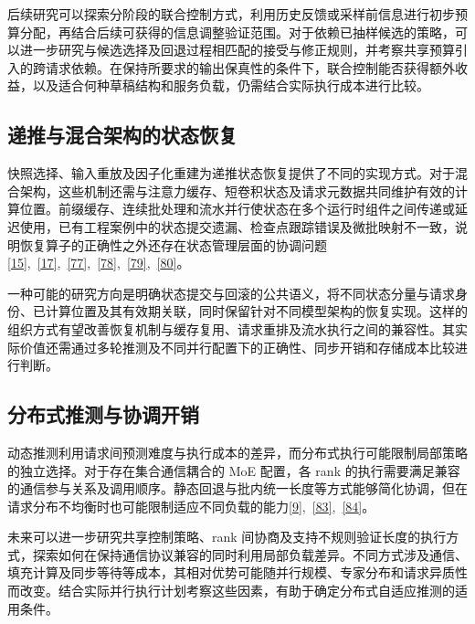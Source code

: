 \documentclass[11pt,a4paper,UTF8,fontset=none,scheme=plain,zihao=-4]{ctexart}
\begin{document}
后续研究可以探索分阶段的联合控制方式，利用历史反馈或采样前信息进行初步预算分配，再结合后续可获得的信息调整验证范围。对于依赖已抽样候选的策略，可以进一步研究与候选选择及回退过程相匹配的接受与修正规则，并考察共享预算引入的跨请求依赖。在保持所要求的输出保真性的条件下，联合控制能否获得额外收益，以及适合何种草稿结构和服务负载，仍需结合实际执行成本进行比较。

\hypertarget{section-8-3}{%
\subsection{递推与混合架构的状态恢复}\label{section-8-3}}

快照选择、输入重放及因子化重建为递推状态恢复提供了不同的实现方式。对于混合架构，这些机制还需与注意力缓存、短卷积状态及请求元数据共同维护有效的计算位置。前缀缓存、连续批处理和流水并行使状态在多个运行时组件之间传递或延迟使用，已有工程案例中的状态提交遗漏、检查点跟踪错误及微批映射不一致，说明恢复算子的正确性之外还存在状态管理层面的协调问题\protect\hyperlink{ref-replayssm}{{[}15{]}},~\protect\hyperlink{ref-twig}{{[}17{]}},~\protect\hyperlink{ref-sglngramcommit}{{[}77{]}},~\protect\hyperlink{ref-sglsconvcommit}{{[}78{]}},~\protect\hyperlink{ref-sglppcommit}{{[}79{]}},~\protect\hyperlink{ref-sglpprows}{{[}80{]}}。

一种可能的研究方向是明确状态提交与回滚的公共语义，将不同状态分量与请求身份、已计算位置及其有效期关联，同时保留针对不同模型架构的恢复实现。这样的组织方式有望改善恢复机制与缓存复用、请求重排及流水执行之间的兼容性。其实际价值还需通过多轮推测及不同并行配置下的正确性、同步开销和存储成本比较进行判断。

\hypertarget{section-8-4}{%
\subsection{分布式推测与协调开销}\label{section-8-4}}

动态推测利用请求间预测难度与执行成本的差异，而分布式执行可能限制局部策略的独立选择。对于存在集合通信耦合的
MoE 配置，各 rank
的执行需要满足兼容的通信参与关系及调用顺序。静态回退与批内统一长度等方式能够简化协调，但在请求分布不均衡时也可能限制适应不同负载的能力\protect\hyperlink{ref-hybridspec}{{[}9{]}},~\protect\hyperlink{ref-vllmdynamic034}{{[}83{]}},~\protect\hyperlink{ref-vllmdynamiclatest}{{[}84{]}}。

未来可以进一步研究共享控制策略、rank
间协商及支持不规则验证长度的执行方式，探索如何在保持通信协议兼容的同时利用局部负载差异。不同方式涉及通信、填充计算及同步等待等成本，其相对优势可能随并行规模、专家分布和请求异质性而改变。结合实际并行执行计划考察这些因素，有助于确定分布式自适应推测的适用条件。
\end{document}
